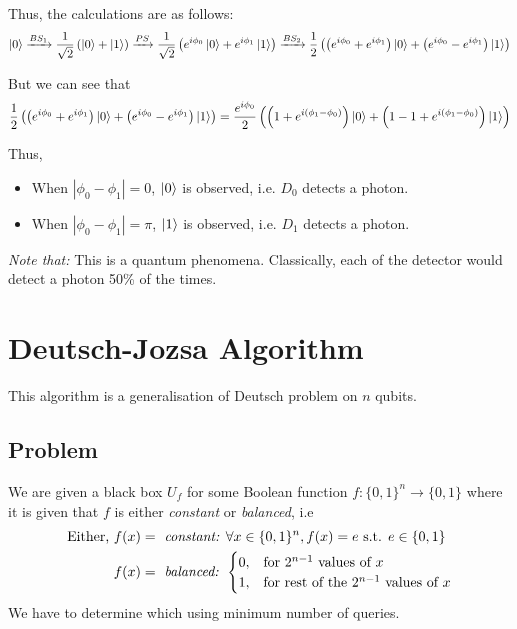 \documentclass[11.5pt, paper=a4]{article}
\theoremstyle{definition}
\numberwithin{theorem}{section}
\begin{document}
Thus, the calculations are as follows:
\begin{equation}
\ket0\xrightarrow{BS_1}\frac{1}{\sqrt2}\left(\ket0+\ket1\right)\xrightarrow{PS}\frac{1}{\sqrt2}\left(e^{i\phi_0}\ket0+e^{i\phi_1}\ket1\right)\xrightarrow{BS_2}\frac{1}{2}\left(\left(e^{i\phi_0}+e^{i\phi_1}\right)\ket0+\left(e^{i\phi_0}-e^{i\phi_1}\right)\ket1\right)
\end{equation}

But we can see that
\begin{equation}
\frac{1}{2}\left(\left(e^{i\phi_0}+e^{i\phi_1}\right)\ket0+\left(e^{i\phi_0}-e^{i\phi_1}\right)\ket1\right)=\frac{e^{i\phi_0}}{2}\left(\left(1+e^{i\left(\phi_1-\phi_0\right)}\right)\ket0+\left(1-1+e^{i\left(\phi_1-\phi_0\right)}\right)\ket1\right)
\end{equation}

Thus,
\begin{itemize}
\item When $\left|\phi_0-\phi_1\right|=0$, $\ket0$ is observed, i.e. $D_0$ detects a photon.
\item When $\left|\phi_0-\phi_1\right|=\pi$, $\ket1$ is observed, i.e. $D_1$ detects a photon.
\end{itemize}

\emph{Note that:} This is a quantum phenomena. Classically, each of the detector would detect a photon 50\% of the times.



\section{Deutsch-Jozsa Algorithm}
This algorithm is a generalisation of Deutsch problem on $n$ qubits.

\subsection{Problem}
We are given a black box $U_f$ for some Boolean function $f:\{0,1\}^n\rightarrow\{0,1\}$ where it is given that $f$ is either \emph{constant} or \emph{balanced}, i.e
\begin{align*}
\text{Either, }&f(x)=\emph{ constant: }\forall x\in\{0,1\}^n,f(x)=e\text{ s.t. }e\in\{0,1\}\\
&f(x)=\emph{ balanced: }
\begin{cases}
0,&\text{for }2^{n-1}\text{ values of }x\\
1,&\text{for rest of the }2^{n-1}\text{ values of }x
\end{cases}
\end{align*}
We have to determine which using minimum number of queries.
\end{document}

